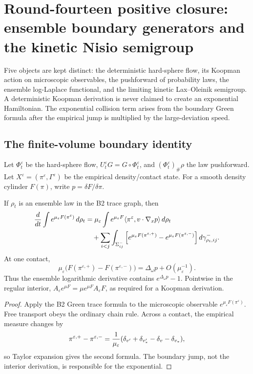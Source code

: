 
\section{Round-fourteen positive closure: ensemble boundary generators and the kinetic Nisio semigroup}
\label{sec:r14-b4}

Five objects are kept distinct: the deterministic hard-sphere flow, its
Koopman action on microscopic observables, the pushforward of probability
laws, the ensemble log-Laplace functional, and the limiting kinetic
Lax--Oleinik semigroup.  A deterministic Koopman derivation is never claimed
to create an exponential Hamiltonian.  The exponential collision term arises
from the boundary Green formula after the empirical jump is multiplied by
the large-deviation speed.

\subsection{The finite-volume boundary identity}

Let \(\Phi_t^\varepsilon\) be the hard-sphere flow,
\(U_t^\varepsilon G=G\circ\Phi_t^\varepsilon\), and
\((\Phi_t^\varepsilon)_\#\rho\) the law pushforward.  Let
\(X^\varepsilon=(\pi^\varepsilon,\Gamma^\varepsilon)\) be the empirical
density/contact state.  For a smooth density cylinder
\(F(\pi)\), write \(p=\delta F/\delta\pi\).

\begin{theorem}
\label{thm:r14-b4-green}
If \(\rho_t\) is an ensemble law in the B2 trace graph, then
\[
 \begin{aligned}
 {d\over dt}\int e^{\mu_\varepsilon F(\pi^\varepsilon)}\,d\rho_t
 &=
 \mu_\varepsilon\int
 e^{\mu_\varepsilon F}
 \langle\pi^\varepsilon,v\cdot\nabla_xp\rangle\,d\rho_t\\
 &\quad+
 \sum_{i<j}\int_{\Sigma_{ij}^-}
 \left[
 e^{\mu_\varepsilon F(\pi^{\varepsilon,+})}
 -e^{\mu_\varepsilon F(\pi^{\varepsilon,-})}
 \right]d\gamma_{\rho_t,ij}^- .
 \end{aligned}
\]
At one contact,
\[
 \mu_\varepsilon
 \bigl(F(\pi^{\varepsilon,+})-F(\pi^{\varepsilon,-})\bigr)
 =\Delta_\omega p+O(\mu_\varepsilon^{-1}).
\]
Thus the ensemble logarithmic derivative contains
\(e^{\Delta_\omega p}-1\).  Pointwise in the regular interior,
\(A_\varepsilon e^{\mu F}=\mu e^{\mu F}A_\varepsilon F\), as required for a
Koopman derivation.
\end{theorem}

\begin{proof}
Apply the B2 Green trace formula to the microscopic observable
\(e^{\mu_\varepsilon F(\pi^\varepsilon)}\).  Free transport obeys the ordinary
chain rule.  Across a contact, the empirical measure changes by
\[
 \pi^{\varepsilon,+}-\pi^{\varepsilon,-}
 ={1\over\mu_\varepsilon}
 (\delta_{v'}+\delta_{v_*'}-\delta_v-\delta_{v_*}),
\]
so Taylor expansion gives the second formula.  The boundary jump, not the
interior derivation, is responsible for the exponential.
\end{proof}

